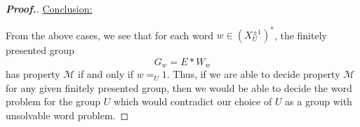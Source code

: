 \documentclass[11pt,a4paper,reqno]{amsart}
\theoremstyle{plain}
\theoremstyle{definition}
\theoremstyle{definition}
\newenvironment{myproof}{\begin{proof}[\normalfont\bfseries Proof.]}{\end{proof}}
\begin{document}
\begin{myproof}
	\medskip

	\noindent
	\underline{Conclusion:}

	\smallskip
	\noindent
	From the above cases, we see that for each word $w \in (X_U^{\pm 1})^*$, the finitely presented group
	\[
		G_w = E * W_w
	\]
	has property $\mathcal M$ if and only if $w =_U 1$.
	Thus, if we are able to decide property $\mathcal M$ for any given finitely presented group, then we would be able to decide the word problem for the group $U$ which would contradict our choice of $U$ as a group with unsolvable word problem.
\end{myproof}

\printbibliography
\bigskip
\end{document}
